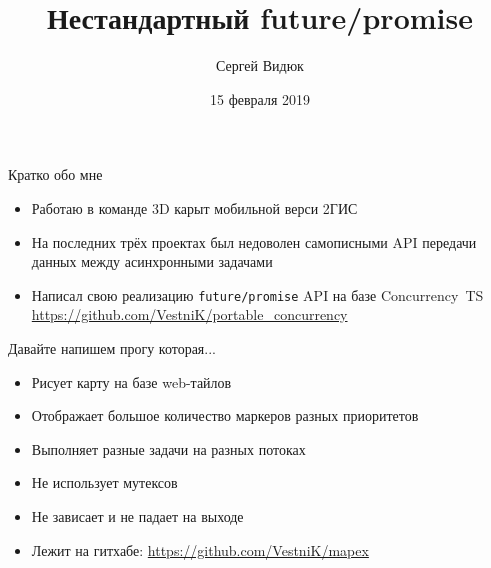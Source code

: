 \documentclass[aspectratio=169,pdf,hyperref={unicode},14pt]{beamer}
\title{Нестандартный future/promise}
\author{Сергей Видюк}
\date{15 февраля 2019}
\begin{document}
\begin{frame}
 \maketitle
\end{frame}

\begin{frame}[t]{Кратко обо мне}
 \begin{itemize}[<+->]
  \item Работаю в команде 3D карыт мобильной верси 2ГИС
  \item На последних трёх проектах был недоволен самописными API передачи данных между асинхронными задачами
  \item Написал свою реализацию \texttt{future/promise} API на базе Concurrency~TS \url{https://github.com/VestniK/portable_concurrency}
 \end{itemize}
\end{frame}

\begin{frame}[t]{Давайте напишем прогу которая...}
 \begin{itemize}[<+->]
  \item Рисует карту на базе web-тайлов
  \item Отображает большое количество маркеров разных приоритетов
  \item Выполняет разные задачи на разных потоках
  \item Не использует мутексов
  \item Не зависает и не падает на выходе
  \item Лежит на гитхабе: \url{https://github.com/VestniK/mapex}
 \end{itemize}
\end{frame}
\end{document}
